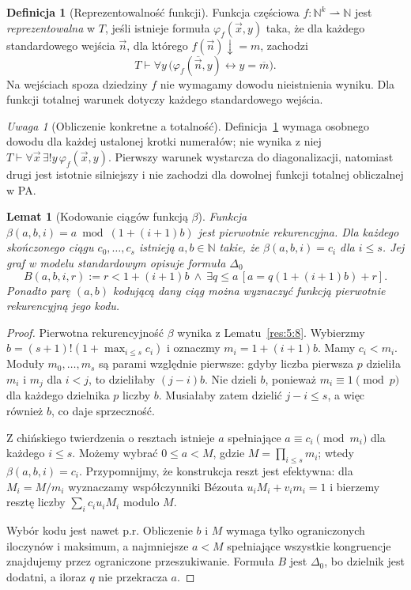 \documentclass[11pt,a4paper]{article}
\numberwithin{equation}{section}
\newcommand{\N}{\mathbb N}
\theoremstyle{plain}
\newtheorem{lemat}[twierdzenie]{Lemat}
\theoremstyle{definition}
\newtheorem{definicja}[twierdzenie]{Definicja}
\theoremstyle{remark}
\newtheorem{uwaga}[twierdzenie]{Uwaga}
\begin{document}
\begin{definicja}[Reprezentowalność funkcji]\label{res:7:2}
Funkcja częściowa $f:\N^k\rightharpoonup\N$ jest \emph{reprezentowalna} w $T$, jeśli istnieje formuła $\varphi_f(\vec x,y)$ taka, że dla każdego standardowego wejścia $\vec n$, dla którego $f(\vec n)\downarrow=m$, zachodzi
\[
T\vdash\forall y\,\bigl(\varphi_f(\overline{\vec n},y)
\leftrightarrow y=\overline m\bigr).
\]
Na wejściach spoza dziedziny $f$ nie wymagamy dowodu nieistnienia wyniku. Dla funkcji totalnej warunek dotyczy każdego standardowego wejścia.
\end{definicja}

\begin{uwaga}[Obliczenie konkretne a totalność]\label{res:7:3}
Definicja~\ref{res:7:2} wymaga osobnego dowodu dla każdej ustalonej krotki numerałów; nie wynika z niej $T\vdash\forall\vec x\,\exists!y\,\varphi_f(\vec x,y)$. Pierwszy warunek wystarcza do diagonalizacji, natomiast drugi jest istotnie silniejszy i nie zachodzi dla dowolnej funkcji totalnej obliczalnej w PA.
\end{uwaga}

\begin{lemat}[Kodowanie ciągów funkcją $\beta$]\label{res:7:4}
Funkcja $\beta(a,b,i)=a\bmod(1+(i+1)b)$ jest pierwotnie rekurencyjna. Dla każdego skończonego ciągu $c_0,\ldots,c_s$ istnieją $a,b\in\N$ takie, że $\beta(a,b,i)=c_i$ dla $i\le s$. Jej graf w modelu standardowym opisuje formuła $\Delta_0$
\[
B(a,b,i,r):=r<1+(i+1)b\ \land\
\exists q\le a\,[a=q(1+(i+1)b)+r].
\]
Ponadto parę $(a,b)$ kodującą dany ciąg można wyznaczyć funkcją pierwotnie rekurencyjną jego kodu.
\end{lemat}
\begin{proof}
Pierwotna rekurencyjność $\beta$ wynika z Lematu~\ref{res:5:8}. Wybierzmy $b=(s+1)!(1+\max_{i\le s}c_i)$ i oznaczmy $m_i=1+(i+1)b$. Mamy $c_i<m_i$. Moduły $m_0,\ldots,m_s$ są parami względnie pierwsze: gdyby liczba pierwsza $p$ dzieliła $m_i$ i $m_j$ dla $i<j$, to dzieliłaby $(j-i)b$. Nie dzieli $b$, ponieważ $m_i\equiv1\pmod p$ dla każdego dzielnika $p$ liczby $b$. Musiałaby zatem dzielić $j-i\le s$, a więc również $b$, co daje sprzeczność.

Z chińskiego twierdzenia o resztach istnieje $a$ spełniające $a\equiv c_i\pmod{m_i}$ dla każdego $i\le s$. Możemy wybrać $0\le a<M$, gdzie $M=\prod_{i\le s}m_i$; wtedy $\beta(a,b,i)=c_i$. Przypomnijmy, że konstrukcja reszt jest efektywna: dla $M_i=M/m_i$ wyznaczamy współczynniki Bézouta $u_iM_i+v_im_i=1$ i bierzemy resztę liczby $\sum_i c_i u_iM_i$ modulo $M$.

Wybór kodu jest nawet p.r. Obliczenie $b$ i $M$ wymaga tylko ograniczonych iloczynów i maksimum, a najmniejsze $a<M$ spełniające wszystkie kongruencje znajdujemy przez ograniczone przeszukiwanie. Formuła $B$ jest $\Delta_0$, bo dzielnik jest dodatni, a iloraz $q$ nie przekracza $a$.
\end{proof}
\end{document}
